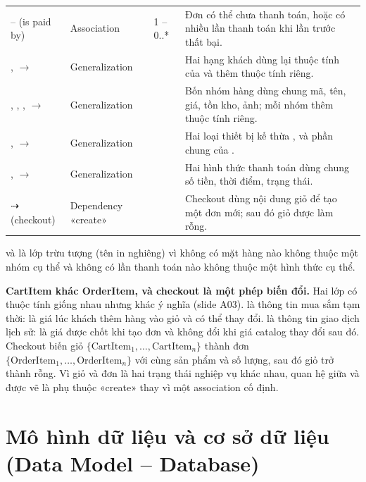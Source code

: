 \documentclass[12pt,a4paper]{article}
\begin{document}
\begin{longtable}{@{}P{4.0cm}P{2.3cm}P{1.8cm}P{7.4cm}@{}}
\small{} --  (is paid by) & \small Association & \small 1 -- 0..* & \small Đơn có thể chưa thanh toán, hoặc có nhiều lần thanh toán khi lần trước thất bại.\\
\small{},  $\to$  & \small Generalization & & \small Hai hạng khách dùng lại thuộc tính của  và thêm thuộc tính riêng.\\
\small{}, , ,  $\to$  & \small Generalization & & \small Bốn nhóm hàng dùng chung mã, tên, giá, tồn kho, ảnh; mỗi nhóm thêm thuộc tính riêng.\\
\small{},  $\to$  & \small Generalization & & \small Hai loại thiết bị kế thừa ,  và phần chung của .\\
\small{},  $\to$  & \small Generalization & & \small Hai hình thức thanh toán dùng chung số tiền, thời điểm, trạng thái.\\
\small{} $\dashrightarrow$  (checkout) & \small Dependency «create» & & \small Checkout dùng nội dung giỏ để tạo một đơn mới; sau đó giỏ được làm rỗng.\\
\bottomrule
\end{longtable}

 và  là lớp trừu tượng (tên in nghiêng) vì không có mặt hàng nào không thuộc
một nhóm cụ thể và không có lần thanh toán nào không thuộc một hình thức cụ thể.

\textbf{CartItem khác OrderItem, và checkout là một phép biến đổi.} Hai lớp có thuộc tính giống nhau
nhưng khác ý nghĩa (slide A03).  là thông tin mua sắm tạm thời:  là giá
lúc khách thêm hàng vào giỏ và có thể thay đổi.  là thông tin giao dịch lịch sử:
 là giá được chốt khi tạo đơn và không đổi khi giá catalog thay đổi sau đó. Checkout
biến giỏ $\{\text{CartItem}_1,\dots,\text{CartItem}_n\}$ thành đơn
$\{\text{OrderItem}_1,\dots,\text{OrderItem}_n\}$ với cùng sản phẩm và số lượng, sau đó giỏ trở thành
rỗng. Vì giỏ và đơn là hai trạng thái nghiệp vụ khác nhau, quan hệ giữa  và  được
vẽ là phụ thuộc «create» thay vì một association cố định.

\section{Mô hình dữ liệu và cơ sở dữ liệu (Data Model -- Database)}\label{sec:42}
\end{document}
